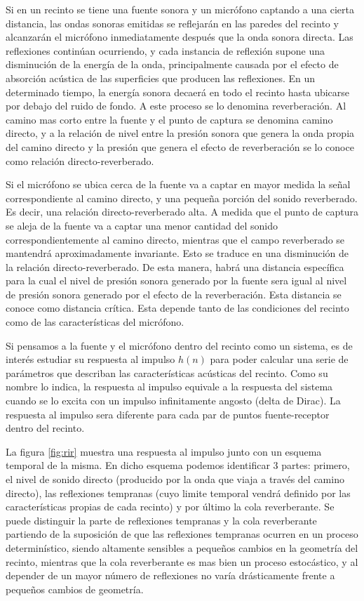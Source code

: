 Si en un recinto se tiene una fuente sonora y un micrófono captando a una cierta distancia, las ondas sonoras emitidas se reflejarán en las paredes del recinto y alcanzarán el micrófono inmediatamente después que la onda sonora directa. Las reflexiones continúan ocurriendo, y cada instancia de reflexión supone una disminución de la energía de la onda, principalmente causada por el efecto de absorción acústica de las superficies que producen las reflexiones. En un determinado tiempo, la energía sonora decaerá en todo el recinto hasta ubicarse por debajo del ruido de fondo. A este proceso se lo denomina reverberación. Al camino mas corto entre la fuente y el punto de captura se denomina camino directo, y a la relación de nivel entre la presión sonora que genera la onda propia del camino directo y la presión que genera el efecto de reverberación se lo conoce como relación directo-reverberado. 

Si el micrófono se ubica cerca de la fuente va a captar en mayor medida la señal correspondiente al camino directo, y una pequeña porción del sonido reverberado. Es decir, una relación directo-reverberado alta. A medida que el punto de captura se aleja de la fuente va a captar una menor cantidad del sonido correspondientemente al camino directo, mientras que el campo reverberado se mantendrá aproximadamente invariante. Esto se traduce en una disminución de la relación directo-reverberado. 
De esta manera, habrá una distancia específica para la cual el nivel de presión sonora generado por la fuente sera igual al nivel de presión sonora generado por el efecto de la reverberación. Esta distancia se conoce como distancia crítica. Esta depende tanto de las condiciones del recinto como de las características del micrófono. 

Si pensamos a la fuente y el micrófono dentro del recinto como un sistema, es de interés estudiar su respuesta al impulso $h(n)$ para poder calcular una serie de parámetros que describan las características acústicas del recinto. Como su nombre lo indica, la respuesta al impulso equivale a la respuesta del sistema cuando se lo excita con un impulso infinitamente angosto (delta de Dirac). La respuesta al impulso sera diferente para cada par de puntos fuente-receptor dentro del recinto.   


La figura \ref{fig:rir} muestra una respuesta al impulso junto con un esquema temporal de la misma. En dicho esquema podemos identificar 3 partes: primero, el nivel de sonido directo (producido por la onda que viaja a través del camino directo), las reflexiones tempranas (cuyo limite temporal vendrá definido por las características propias de cada recinto) y por último la cola reverberante. Se puede distinguir la parte de reflexiones tempranas y la cola reverberante partiendo de la suposición de que las reflexiones tempranas ocurren en un proceso determinístico, siendo altamente sensibles a pequeños cambios en la geometría del recinto, mientras que la cola reverberante es mas bien un proceso estocástico, y al depender de un mayor número de reflexiones no varía drásticamente frente a pequeños cambios de geometría. 

